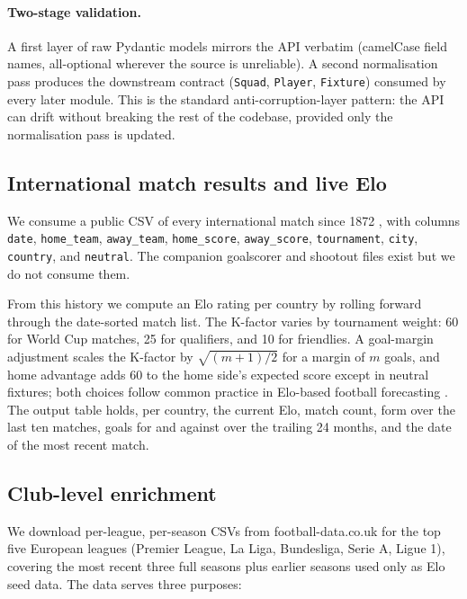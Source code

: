 \paragraph{Two-stage validation.}
A first layer of raw Pydantic models mirrors the API verbatim
(camelCase field names, all-optional wherever the source is
unreliable). A second normalisation pass produces the downstream
contract (\texttt{Squad}, \texttt{Player}, \texttt{Fixture}) consumed
by every later module. This is the standard anti-corruption-layer
pattern: the API can drift without breaking the rest of the codebase,
provided only the normalisation pass is updated.

\subsection{International match results and live Elo}
\label{sec:data-elo}

We consume a public CSV of every international match since 1872
\citep{martj42}, with columns \texttt{date}, \texttt{home\_team},
\texttt{away\_team}, \texttt{home\_score}, \texttt{away\_score},
\texttt{tournament}, \texttt{city}, \texttt{country}, and
\texttt{neutral}. The companion goalscorer and shootout files exist
but we do not consume them.

From this history we compute an Elo rating \citep{elo1978rating} per
country by rolling forward through the date-sorted match list. The
K-factor varies by tournament weight: 60 for World Cup matches, 25
for qualifiers, and 10 for friendlies. A goal-margin adjustment
scales the K-factor by $\sqrt{(m+1)/2}$ for a margin of $m$ goals,
and home advantage adds 60 to the home side's expected score except
in neutral fixtures; both choices follow common practice in
Elo-based football forecasting \citep{hvattum2010using}. The output
table holds, per country, the current Elo, match count, form over the
last ten matches, goals for and against over the trailing 24 months,
and the date of the most recent match.

\subsection{Club-level enrichment}
\label{sec:data-clubs}

We download per-league, per-season CSVs from football-data.co.uk
\citep{footballdata} for the top five European leagues (Premier
League, La Liga, Bundesliga, Serie A, Ligue 1), covering the most
recent three full seasons plus earlier seasons used only as Elo seed
data. The data serves three purposes:

